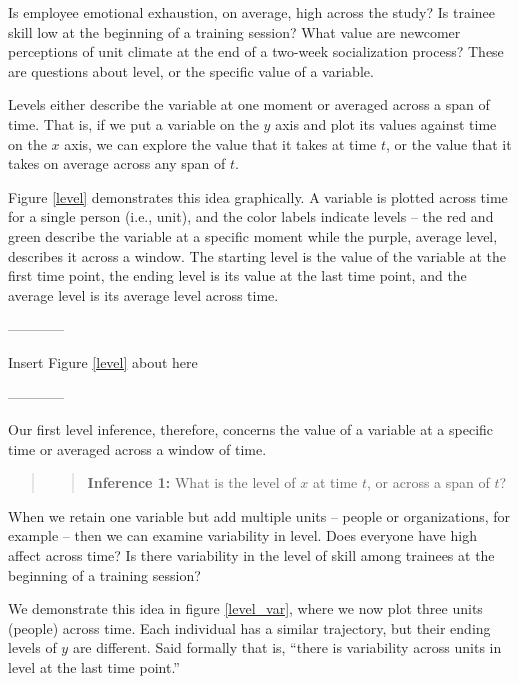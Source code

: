 \documentclass[english,,man]{apa6}
\theoremstyle{definition}
\theoremstyle{definition}
\theoremstyle{definition}
\theoremstyle{remark}
\begin{document}
Is employee emotional exhaustion, on average, high across the study? Is
trainee skill low at the beginning of a training session? What value are
newcomer perceptions of unit climate at the end of a two-week
socialization process? These are questions about level, or the specific
value of a variable.

Levels either describe the variable at one moment or averaged across a
span of time. That is, if we put a variable on the \(y\) axis and plot
its values against time on the \(x\) axis, we can explore the value that
it takes at time \(t\), or the value that it takes on average across any
span of \(t\).

Figure \ref{level} demonstrates this idea graphically. A variable is
plotted across time for a single person (i.e., unit), and the color
labels indicate levels -- the red and green describe the variable at a
specific moment while the purple, average level, describes it across a
window. The starting level is the value of the variable at the first
time point, the ending level is its value at the last time point, and
the average level is its average level across time.

\begin{center}

------------

Insert Figure \ref{level} about here

------------

\end{center}

\noindent Our first level inference, therefore, concerns the value of a
variable at a specific time or averaged across a window of time.

\begin{quote}
\begin{quote}
\textbf{Inference 1:} What is the level of \(x\) at time \(t\), or
across a span of \(t\)?
\end{quote}
\end{quote}

When we retain one variable but add multiple units -- people or
organizations, for example -- then we can examine variability in level.
Does everyone have high affect across time? Is there variability in the
level of skill among trainees at the beginning of a training session?

We demonstrate this idea in figure \ref{level_var}, where we now plot
three units (people) across time. Each individual has a similar
trajectory, but their ending levels of \(y\) are different. Said
formally that is, \enquote{there is variability across units in level at
the last time point.}
\end{document}
